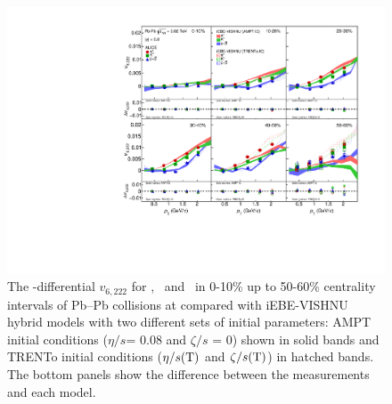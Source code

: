 \documentclass[ALICE,manyauthors]{cernphprep}
\begin{document}
\begin{figure}[h]
\begin{center}
\includegraphics[scale=0.73]{figures/model/TrentoAndAMPT_v6222_gap00_PID2.pdf}
\end{center}
\caption{The \pT-differential $v_{6,222}$ for \pion, \kaon~and \proton~in 0-10\% up to 50-60\% centrality intervals of Pb--Pb collisions at \sNN compared with iEBE-VISHNU hybrid models with two different sets of initial parameters: AMPT initial conditions ($\eta/s$= 0.08 and $\zeta/s$ = 0) shown in solid bands and TRENTo initial conditions ($\eta/s({\rm T})$ and $\zeta/s({\rm T})$) in hatched bands. The bottom panels show the difference between the measurements and each model.}
\label{v6222_model}
\end{figure}
\end{document}
